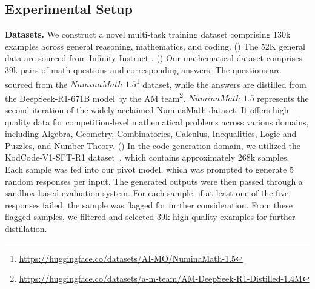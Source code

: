 \documentclass{article}
\begin{document}
\subsection{Experimental Setup}
\label{Experimental Setup}

\begin{table}
\renewcommand\arraystretch{1.2}
\setlength{\tabcolsep}{4pt}
\begin{center}
\huge
\vspace{-2em}
\vspace{-0.5em}
\caption{\small Statistics of the novel datasets.}
\label{tab:dataset-stats}
\end{center}
\vspace{-1.5em}
\end{table}

\textbf{Datasets.}
We construct a novel multi-task training dataset comprising 130k examples across general reasoning, mathematics, and coding. () The 52K general data are sourced from Infinity-Instruct \cite{li2024superfiltering}.
() Our mathematical dataset comprises 39k pairs of math questions and corresponding answers. The questions are sourced from the $NuminaMath\_1.5$\footnote{\href{https://huggingface.co/datasets/AI-MO/NuminaMath-1.5}{https://huggingface.co/datasets/AI-MO/NuminaMath-1.5}} dataset, while the answers are distilled from the DeepSeek-R1-671B model by the AM team\footnote{\href{https://huggingface.co/datasets/a-m-team/AM-DeepSeek-R1-Distilled-1.4M}{https://huggingface.co/datasets/a-m-team/AM-DeepSeek-R1-Distilled-1.4M}}. $NuminaMath\_1.5$ represents the second iteration of the widely acclaimed NuminaMath\cite{li2024numinamath} dataset. It offers high-quality data for competition-level mathematical problems across various domains, including Algebra, Geometry, Combinatorics, Calculus, Inequalities, Logic and Puzzles, and Number Theory. () In the code generation domain, we utilized the KodCode-V1-SFT-R1 dataset~\cite{xu2025kodcode}, which contains approximately 268k samples. Each sample was fed into our pivot model, which was prompted to generate 5 random responses per input. The generated outputs were then passed through a sandbox-based evaluation system. For each sample, if at least one of the five responses failed, the sample was flagged for further consideration. From these flagged samples, we filtered and selected 39k high-quality examples for further distillation.
\end{document}

